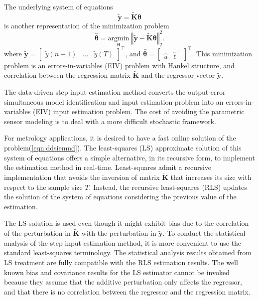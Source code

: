 The underlying system of equations 
\begin{equation} \widetilde{\mathbf{y}} = \widetilde{\mathbf{K}} \bm{\theta} \label{eqn:ddsiemnd} \end{equation}
is another representation of the minimization problem
\begin{equation} \widehat{\bm{\theta}} = \underset{\bm{\theta}}{\mathrm{argmin}} \ \left\Vert  \widetilde{\mathbf{y}} - \widetilde{\mathbf{K}} \bm{\theta} \right\Vert^2_2 . \label{eqn:min_seiv} \end{equation}
where $\widetilde{\mathbf{y}} = \begin{bmatrix} \widetilde{y}(n+1) & \ldots & \widetilde{y}(T) \end{bmatrix}^\top$, and
$\widehat{\bm{\theta}} = \begin{bmatrix} \widehat{{u}} & \widehat{\bm{\ell}}^\top \end{bmatrix}^\top$. 
This minimization problem is an errors-in-variables (EIV) problem with Hankel structure, and correlation between the regression matrix $\widetilde{\mathbf{K}}$ and the regressor vector $\widetilde{\mathbf{y}}$.

The data-driven step input estimation method converts the output-error simultaneous model identification and input estimation problem into an errors-in-variables (EIV) input estimation problem.
The cost of avoiding the parametric sensor modeling is to deal with a more difficult stochastic framework.

For metrology applications, it is desired to have a fast online solution of the problem(\ref{eqn:ddsiemnd}).
The least-squares (LS) approximate solution of this system of equations offers a simple alternative, in its recursive form, to implement the estimation method in real-time.
Least-squares admit a recursive implementation that avoids the inversion of matrix $\widetilde{\mathbf{K}}$ that increases its size with respect to the sample size $T$.
Instead, the recursive least-squares (RLS) updates the solution of the system of equations considering the previous value of the estimation.

The LS solution is used even though it might exhibit bias due to the correlation of the perturbation in $\widetilde{\mathbf{K}}$ with the perturbation in $\widetilde{\mathbf{y}}$.
To conduct the statistical analysis of the step input estimation method, it is more convenient to use the standard least-squares terminology.
The statistical analysis results obtained from LS treatment are fully compatible with the RLS estimation results.
The well known bias and covariance results for the LS estimator cannot be invoked because they assume that the additive perturbation only affects the regressor, and that there is no correlation between the regressor and the regression matrix.






